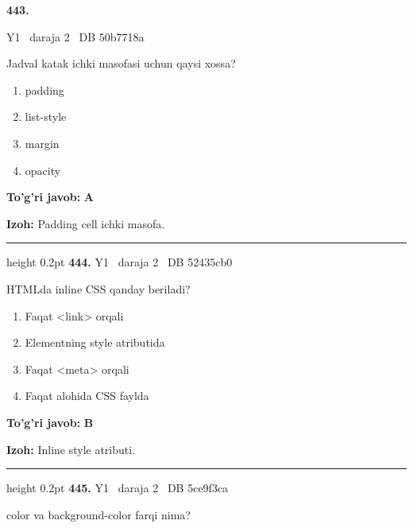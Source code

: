\documentclass[10pt,a4paper,oneside]{article}
\begin{document}
\hypertarget{q443}{\textbf{\color{ink}443.}}  {\color{muted}\scriptsize Y1 \textbullet\ daraja 2 \textbullet\ DB 50b7718a}
\par
Jadval katak ichki masofasi uchun qaysi xossa?
\begin{enumerate}[label=\Alph*),leftmargin=9mm]
\item padding
\item list-style
\item margin
\item opacity
\end{enumerate}
\begin{tcolorbox}[enhanced,breakable,colback=teal!4,colframe=teal!45!black,boxrule=0.45pt,arc=1.2mm,left=2.8mm,right=2.8mm,top=2mm,bottom=2mm,before skip=2mm,after skip=2mm]
\textbf{\color{teal}To'g'ri javob:} \textbf{A}
\par\smallskip
\textbf{Izoh:} Padding cell ichki masofa.
\end{tcolorbox}
\vspace{2mm}\hrule height 0.2pt \vspace{4mm}
\hypertarget{q444}{\textbf{\color{ink}444.}}  {\color{muted}\scriptsize Y1 \textbullet\ daraja 2 \textbullet\ DB 52435cb0}
\par
HTMLda inline CSS qanday beriladi?
\begin{enumerate}[label=\Alph*),leftmargin=9mm]
\item Faqat \textless{}link\textgreater{} orqali
\item Elementning style atributida
\item Faqat \textless{}meta\textgreater{} orqali
\item Faqat alohida CSS faylda
\end{enumerate}
\begin{tcolorbox}[enhanced,breakable,colback=teal!4,colframe=teal!45!black,boxrule=0.45pt,arc=1.2mm,left=2.8mm,right=2.8mm,top=2mm,bottom=2mm,before skip=2mm,after skip=2mm]
\textbf{\color{teal}To'g'ri javob:} \textbf{B}
\par\smallskip
\textbf{Izoh:} Inline style atributi.
\end{tcolorbox}
\vspace{2mm}\hrule height 0.2pt \vspace{4mm}
\hypertarget{q445}{\textbf{\color{ink}445.}}  {\color{muted}\scriptsize Y1 \textbullet\ daraja 2 \textbullet\ DB 5ce9f3ca}
\par
color va background-color farqi nima?
\end{document}
